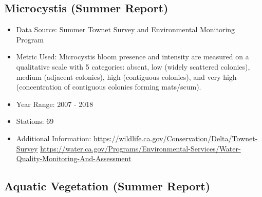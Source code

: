 \documentclass[
]{book}
\providecommand{\tightlist}{%
  \setlength{\itemsep}{0pt}\setlength{\parskip}{0pt}}
\begin{document}
\hypertarget{microcystis-summer-report}{%
\subsection{Microcystis (Summer Report)}\label{microcystis-summer-report}}

\begin{itemize}
\tightlist
\item
  Data Source: Summer Townet Survey and Environmental Monitoring Program
\item
  Metric Used: Microcystis bloom presence and intensity are measured on a qualitative scale with 5 categories: absent, low (widely scattered colonies), medium (adjacent colonies), high (contiguous colonies), and very high (concentration of contiguous colonies forming mats/scum).
\item
  Year Range: 2007 - 2018
\item
  Stations: 69
\item
  Additional Information: \url{https://wildlife.ca.gov/Conservation/Delta/Townet-Survey} \url{https://water.ca.gov/Programs/Environmental-Services/Water-Quality-Monitoring-And-Assessment}
\end{itemize}

\hypertarget{aquatic-vegetation-summer-report}{%
\subsection{Aquatic Vegetation (Summer Report)}\label{aquatic-vegetation-summer-report}}
\end{document}
